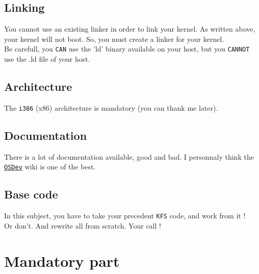 \documentclass{42-en}
\begin{document}
	\section{Linking}
		You cannot use an existing linker in order to link your kernel.
		As written above, your kernel will not boot. So, you must create a linker
		for your kernel.\\
		Be carefull, you \texttt{CAN} use the 'ld' binary available on your host,
		but you \texttt{CANNOT} use the .ld file of your host.
	\section{Architecture}
		The \texttt{i386} (x86) architecture is mandatory
		(you can thank me later).
	\section{Documentation}
		There is a lot of documentation available, good and bad.
		I personnaly think the \texttt{\href{http://wiki.osdev.org/Main_Page}
		{OSDev}} wiki is one of the best.
	\section{Base code}
		In this subject, you have to take your precedent \texttt{KFS} code,
		and work from it !\\ Or don't. And rewrite all from scratch. Your call !

\newpage
\chapter{Mandatory part}
\end{document}
